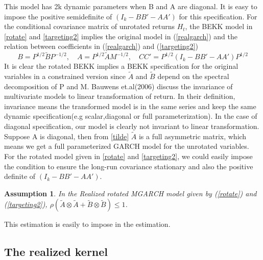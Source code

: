 \documentclass[titlepage,11pt]{article}
\newtheorem{assumption}{Assumption}
\begin{document}
This model has 2k dynamic parameters when B and A are diagonal. It is easy to impose the positive semidefinite of $(I_k-BB'-AA')$ for this specification. For the conditional covariance matrix of unrotated returns $H_t$, the BEKK model in \ref{rotate} and \ref{targeting2} implies the original model in (\ref{realgarch}) and the relation between coefficients in (\ref{realgarch}) and (\ref{targeting2})
\begin{equation}
\label{tilde}
  B = P^{1/2} \tilde{B} P^{-1/2}, \quad A = P^{1/2} \tilde{A} M^{-1/2}, 
 \quad   CC' = P^{1/2} (I_k-BB'-AA') P^{1/2}
\end{equation}
It is clear the rotated BEKK implies a BEKK specification for the original variables in a constrained version since $\tilde{A}$ and $\tilde{B}$ depend on the spectral decomposition of P and M. 
Bauwens et.al(2006) discuss the invariance of multivariate models to linear transformation of return. In their definition, invariance means the transformed model is in the same series and keep the same dynamic specification(e.g scalar,diagonal or full parameterization). In the case of diagonal specification, our model is clearly not invariant to linear transformation. Suppose A is diagonal, then from \ref{tilde} $\tilde{A} $ is a full asymmetric matrix, which means we get a full parameterized GARCH model for the unrotated variables. 
For the rotated model given in \ref{rotate} and \ref{targeting2}, we could easily impose the condition to ensure the long-run covariance stationary and also the positive definite of $(I_k-BB'-AA')$.

\begin{assumption}
	\label{ass_2}
	In the Realized rotated MGARCH model given by (\ref{rotate}) and (\ref{targeting2}), $\rho(\tilde{A} \otimes \tilde{A}+\tilde{B} \otimes \tilde{B}) \le 1$.
\end{assumption}
This estimation is easily to impose in the estimation.


\subsection{The realized kernel}
\end{document}
